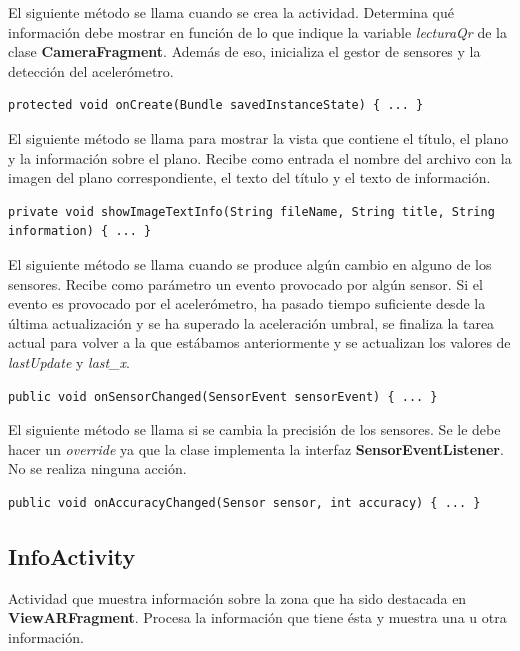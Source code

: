 \documentclass[11pt,a4paper]{article}
\begin{document}
El siguiente método se llama cuando se crea la actividad. Determina qué información debe mostrar en función de lo que indique
la variable \textit{lecturaQr} de la clase \textbf{CameraFragment}. Además de eso, inicializa el gestor de sensores y la detección
del acelerómetro.

\begin{lstlisting}
protected void onCreate(Bundle savedInstanceState) { ... }
\end{lstlisting}

El siguiente método se llama para mostrar la vista que contiene el título, el plano y la información sobre el plano. Recibe como entrada
el nombre del archivo con la imagen del plano correspondiente, el texto del título y el texto de información.

\begin{lstlisting}
private void showImageTextInfo(String fileName, String title, String information) { ... }
\end{lstlisting}

El siguiente método se llama cuando se produce algún cambio en alguno de los sensores. Recibe como parámetro un evento provocado
por algún sensor. Si el evento es provocado por el acelerómetro, ha pasado tiempo suficiente desde la última actualización y se ha
superado la aceleración umbral, se finaliza la tarea actual para volver a la que estábamos anteriormente y se actualizan los valores de \textit{lastUpdate} y \textit{last\_x}.

\begin{lstlisting}
public void onSensorChanged(SensorEvent sensorEvent) { ... }
\end{lstlisting}

El siguiente método se llama si se cambia la precisión de los sensores. Se le debe hacer un \textit{override} ya que la clase
implementa la interfaz \textbf{SensorEventListener}. No se realiza ninguna acción.

\begin{lstlisting}
public void onAccuracyChanged(Sensor sensor, int accuracy) { ... }
\end{lstlisting}

\subsection{\textbf{InfoActivity}}
\label{sec:info}

Actividad que muestra información sobre la zona que ha sido destacada en \textbf{ViewARFragment}.
Procesa la información que tiene ésta y muestra una u otra información.
\end{document}
